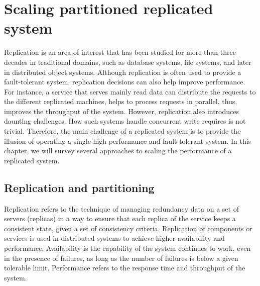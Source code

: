 \chapter[Scaling partitioned replicated system]{Scaling partitioned replicated system}

Replication is an area of interest that has been studied for more than three
decades in traditional domains, such as database systems, file systems, and
later in distributed object systems. Although replication is often used to
provide a fault-tolerant system, replication decisions can also help improve
performance. For instance, a service that serves mainly read data can distribute
the requests to the different replicated machines, helps to process requests in
parallel, thus, improves the throughput of the system. However, replication also
introduces daunting challenges. How such systems handle concurrent write requires
is not trivial. Therefore, the main challenge of a replicated system is to
provide the illusion of operating a single high-performance and fault-tolerant
system. In this chapter, we will survey several approaches to scaling the
performance of a replicated system.

\section{Replication and partitioning}

Replication refers to the technique of managing redundancy data on a set of
servers (replicas) in a way to ensure that each replica of the service keeps a
consistent state, given a set of consistency criteria. Replication of components
or services is used in distributed systems to achieve higher availability and
performance. Availability is the capability of the system continues to work,
even in the presence of failures, as long as the number of failures is below a
given tolerable limit. Performance refers to the response time and throughput of
the system.

